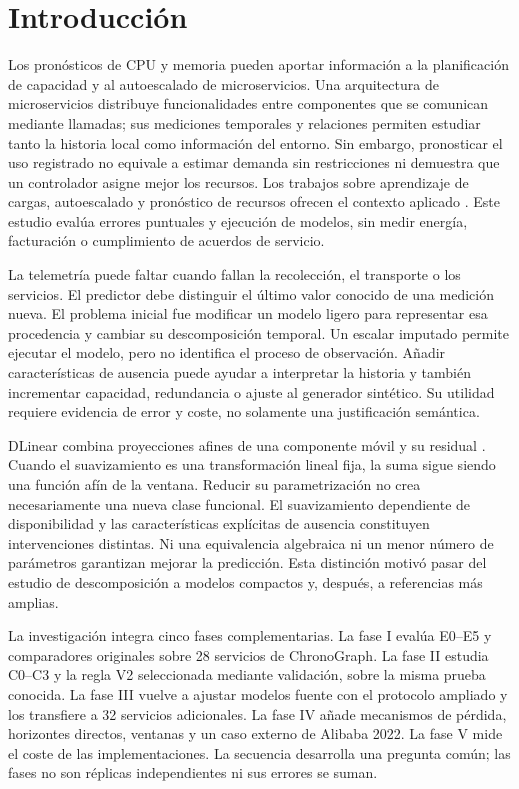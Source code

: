 \section{Introducción}
Los pronósticos de CPU y memoria pueden aportar información a la planificación de capacidad y al autoescalado de microservicios. Una arquitectura de microservicios distribuye funcionalidades entre componentes que se comunican mediante llamadas; sus mediciones temporales y relaciones permiten estudiar tanto la historia local como información del entorno. Sin embargo, pronosticar el uso registrado no equivale a estimar demanda sin restricciones ni demuestra que un controlador asigne mejor los recursos. Los trabajos sobre aprendizaje de cargas, autoescalado y pronóstico de recursos ofrecen el contexto aplicado \cite{powerprediction,autoscaling2025,temposcale,aero}. Este estudio evalúa errores puntuales y ejecución de modelos, sin medir energía, facturación o cumplimiento de acuerdos de servicio.

La telemetría puede faltar cuando fallan la recolección, el transporte o los servicios. El predictor debe distinguir el último valor conocido de una medición nueva. El problema inicial fue modificar un modelo ligero para representar esa procedencia y cambiar su descomposición temporal. Un escalar imputado permite ejecutar el modelo, pero no identifica el proceso de observación. Añadir características de ausencia puede ayudar a interpretar la historia y también incrementar capacidad, redundancia o ajuste al generador sintético. Su utilidad requiere evidencia de error y coste, no solamente una justificación semántica.

DLinear combina proyecciones afines de una componente móvil y su residual \cite{dlinear}. Cuando el suavizamiento es una transformación lineal fija, la suma sigue siendo una función afín de la ventana. Reducir su parametrización no crea necesariamente una nueva clase funcional. El suavizamiento dependiente de disponibilidad y las características explícitas de ausencia constituyen intervenciones distintas. Ni una equivalencia algebraica ni un menor número de parámetros garantizan mejorar la predicción. Esta distinción motivó pasar del estudio de descomposición a modelos compactos y, después, a referencias más amplias.

La investigación integra cinco fases complementarias. La fase I evalúa E0--E5 y comparadores originales sobre 28 servicios de ChronoGraph. La fase II estudia C0--C3 y la regla V2 seleccionada mediante validación, sobre la misma prueba conocida. La fase III vuelve a ajustar modelos fuente con el protocolo ampliado y los transfiere a 32 servicios adicionales. La fase IV añade mecanismos de pérdida, horizontes directos, ventanas y un caso externo de Alibaba 2022. La fase V mide el coste de las implementaciones. La secuencia desarrolla una pregunta común; las fases no son réplicas independientes ni sus errores se suman.

